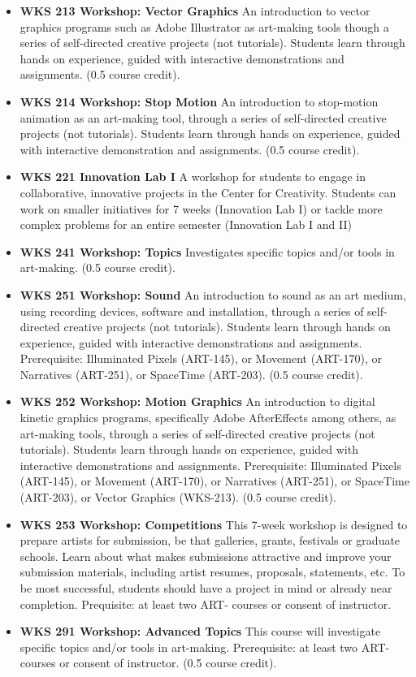 \documentclass[
  letterpaper,
]{scrbook}
\begin{document}
\begin{itemize}
  (0.5 course credit).
\item
  \textbf{WKS 213 Workshop: Vector Graphics} An introduction to vector
  graphics programs such as Adobe Illustrator as art-making tools though
  a series of self-directed creative projects (not tutorials). Students
  learn through hands on experience, guided with interactive
  demonstrations and assignments. (0.5 course credit).\\
\item
  \textbf{WKS 214 Workshop: Stop Motion} An introduction to stop-motion
  animation as an art-making tool, through a series of self-directed
  creative projects (not tutorials). Students learn through hands on
  experience, guided with interactive demonstration and assignments.
  (0.5 course credit).
\item
  \textbf{WKS 221 Innovation Lab I} A workshop for students to engage in
  collaborative, innovative projects in the Center for Creativity.
  Students can work on smaller initiatives for 7 weeks (Innovation Lab
  I) or tackle more complex problems for an entire semester (Innovation
  Lab I and II)\\
\item
  \textbf{WKS 241 Workshop: Topics} Investigates specific topics and/or
  tools in art-making. (0.5 course credit).
\item
  \textbf{WKS 251 Workshop: Sound} An introduction to sound as an art
  medium, using recording devices, software and installation, through a
  series of self-directed creative projects (not tutorials). Students
  learn through hands on experience, guided with interactive
  demonstrations and assignments. Prerequisite: Illuminated Pixels
  (ART-145), or Movement (ART-170), or Narratives (ART-251), or
  SpaceTime (ART-203). (0.5 course credit).\\
\item
  \textbf{WKS 252 Workshop: Motion Graphics} An introduction to digital
  kinetic graphics programs, specifically Adobe AfterEffects among
  others, as art-making tools, through a series of self-directed
  creative projects (not tutorials). Students learn through hands on
  experience, guided with interactive demonstrations and assignments.
  Prerequisite: Illuminated Pixels (ART-145), or Movement (ART-170), or
  Narratives (ART-251), or SpaceTime (ART-203), or Vector Graphics
  (WKS-213). (0.5 course credit).
\item
  \textbf{WKS 253 Workshop: Competitions} This 7-week workshop is
  designed to prepare artists for submission, be that galleries, grants,
  festivals or graduate schools. Learn about what makes submissions
  attractive and improve your submission materials, including artist
  resumes, proposals, statements, etc. To be most successful, students
  should have a project in mind or already near completion. Prequisite:
  at least two ART- courses or consent of instructor.
\item
  \textbf{WKS 291 Workshop: Advanced Topics} This course will
  investigate specific topics and/or tools in art-making. Prerequisite:
  at least two ART- courses or consent of instructor. (0.5 course
  credit).
\end{itemize}
\end{document}
